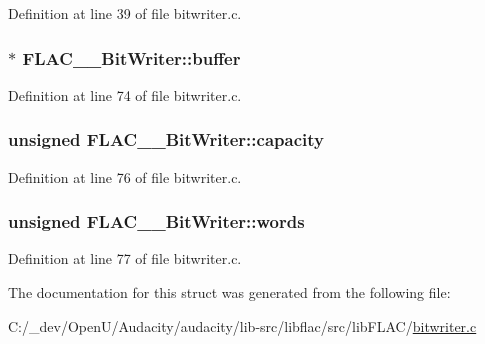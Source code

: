 Definition at line 39 of file bitwriter.\+c.

\subsubsection[{\texorpdfstring{buffer}{buffer}}]{$\ast$ F\+L\+A\+C\+\_\+\+\_\+\+Bit\+Writer\+::buffer}\hypertarget{struct_f_l_a_c_____bit_writer_a67f6b62b61e9b81735a22deefca7b620}{}\label{struct_f_l_a_c_____bit_writer_a67f6b62b61e9b81735a22deefca7b620}


Definition at line 74 of file bitwriter.\+c.

\subsubsection[{\texorpdfstring{capacity}{capacity}}]{\setlength{\rightskip}{0pt plus 5cm}unsigned F\+L\+A\+C\+\_\+\+\_\+\+Bit\+Writer\+::capacity}\hypertarget{struct_f_l_a_c_____bit_writer_aece58c99ff9ff4a2680deee41a422448}{}\label{struct_f_l_a_c_____bit_writer_aece58c99ff9ff4a2680deee41a422448}


Definition at line 76 of file bitwriter.\+c.

\subsubsection[{\texorpdfstring{words}{words}}]{\setlength{\rightskip}{0pt plus 5cm}unsigned F\+L\+A\+C\+\_\+\+\_\+\+Bit\+Writer\+::words}\hypertarget{struct_f_l_a_c_____bit_writer_a03780c7567c8b0da65ad1651e81b85b1}{}\label{struct_f_l_a_c_____bit_writer_a03780c7567c8b0da65ad1651e81b85b1}


Definition at line 77 of file bitwriter.\+c.



The documentation for this struct was generated from the following file\+:\begin{DoxyCompactItemize}
\item 
C\+:/\+\_\+dev/\+Open\+U/\+Audacity/audacity/lib-\/src/libflac/src/lib\+F\+L\+A\+C/\hyperlink{lib_f_l_a_c_2bitwriter_8c}{bitwriter.\+c}\end{DoxyCompactItemize}
